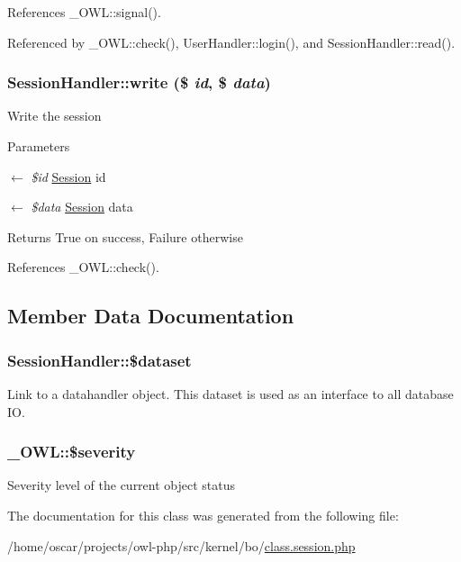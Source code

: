 References \_\-OWL::signal().



Referenced by \_\-OWL::check(), UserHandler::login(), and SessionHandler::read().

\subsubsection[{write}]{\setlength{\rightskip}{0pt plus 5cm}SessionHandler::write (\$ {\em id}, \/  \$ {\em data})}\label{classSessionHandler_ab59071ef0d3deee2472c6916471bd9f5}
Write the session


\begin{DoxyParams}{Parameters}
\item[\mbox{$\leftarrow$} {\em \$id}]\hyperlink{classSession}{Session} id \item[\mbox{$\leftarrow$} {\em \$data}]\hyperlink{classSession}{Session} data \end{DoxyParams}
\begin{DoxyReturn}{Returns}
True on success, Failure otherwise 
\end{DoxyReturn}


References \_\-OWL::check().



\subsection{Member Data Documentation}
\subsubsection[{\$dataset}]{\setlength{\rightskip}{0pt plus 5cm}SessionHandler::\$dataset}\label{classSessionHandler_a74c46fcfbadd4c4e6bacc73ddf350056}
Link to a datahandler object. This dataset is used as an interface to all database IO. 
\subsubsection[{\$severity}]{\setlength{\rightskip}{0pt plus 5cm}\_\-OWL::\$severity}\label{class__OWL_ad26b40a9dbbacb33e299b17826f8327c}
Severity level of the current object status 

The documentation for this class was generated from the following file:\begin{DoxyCompactItemize}
\item 
/home/oscar/projects/owl-\/php/src/kernel/bo/\hyperlink{class_8session_8php}{class.session.php}\end{DoxyCompactItemize}
